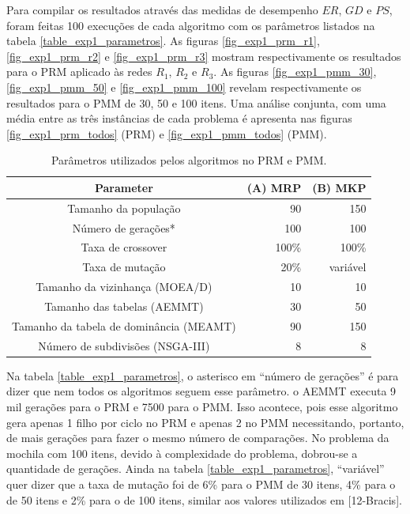 Para compilar os resultados através das medidas de desempenho $ER$, $GD$ e $PS$, foram feitas 100 execuções de cada algoritmo com os parâmetros listados na tabela \ref{table_exp1_parametros}. As figuras \ref{fig_exp1_prm_r1}, \ref{fig_exp1_prm_r2} e \ref{fig_exp1_prm_r3} mostram respectivamente os resultados para o PRM aplicado às redes $R_1$, $R_2$ e $R_3$. As figuras \ref{fig_exp1_pmm_30}, \ref{fig_exp1_pmm_50} e \ref{fig_exp1_pmm_100} revelam respectivamente os resultados para o PMM de 30, 50 e 100 itens. Uma análise conjunta, com uma média entre as três instâncias de cada problema é apresenta nas figuras \ref{fig_exp1_prm_todos} (PRM) e \ref{fig_exp1_pmm_todos} (PMM).

\begin{table}[!htbp]
	\caption{Parâmetros utilizados pelos algoritmos no PRM e PMM.}
	\begin{center}
		\begin{tabular}{c|r|r}
			\textbf{Parameter} & \textbf{(A) MRP} &  \textbf{(B) MKP} \\ %
			\hline
			Tamanho da população                    &    90 &      150 \\ %
			Número de gerações*                     &   100 &      100 \\ %
			Taxa de crossover                       & 100\% &    100\% \\ %
			Taxa de mutação                         &  20\% & variável \\ %
			Tamanho da vizinhança (MOEA/D)          &    10 &       10 \\ %
			Tamanho das tabelas (AEMMT)             &    30 &       50 \\ %
			Tamanho da tabela de dominância (MEAMT) &    90 &      150 \\ %
			Número de subdivisões (NSGA-III)        &     8 &        8 \\
			\hline
		\end{tabular}
		\label{tab_Params}
	\end{center}
\end{table}

Na tabela \ref{table_exp1_parametros}, o asterisco em ``número de gerações'' é para dizer que nem todos os algoritmos seguem esse parâmetro. o AEMMT executa 9 mil gerações para o PRM e 7500 para o PMM. Isso acontece, pois esse algoritmo gera apenas 1 filho por ciclo no PRM e apenas 2 no PMM necessitando, portanto, de mais gerações para fazer o mesmo número de comparações. No problema da mochila com 100 itens, devido à complexidade do problema, dobrou-se a quantidade de gerações. Ainda na tabela \ref{table_exp1_parametros}, ``variável'' quer dizer que a taxa de mutação foi de 6\% para o PMM de 30 itens, 4\% para o de 50 itens e 2\% para o de 100 itens, similar aos valores utilizados em [12-Bracis].

